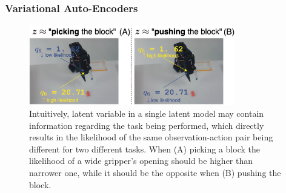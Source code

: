 \subsubsection{Variational Auto-Encoders}

\begin{figure}
    \centering
    \includegraphics[width=0.8\textwidth]{figures/ch4/ch4-task-effect-on-pairs.png}
    \caption{Intuitively, latent variable in a single latent model may contain information regarding the task being performed, which directly results in the likelihood of the same observation-action pair being different for two different tasks. When (A) picking a block the likelihood of a wide gripper's opening should be higher than narrower one, while it should be the opposite when (B) pushing the block.}
    \label{fig:ch4-task-effect-on-pairs}
\end{figure}

